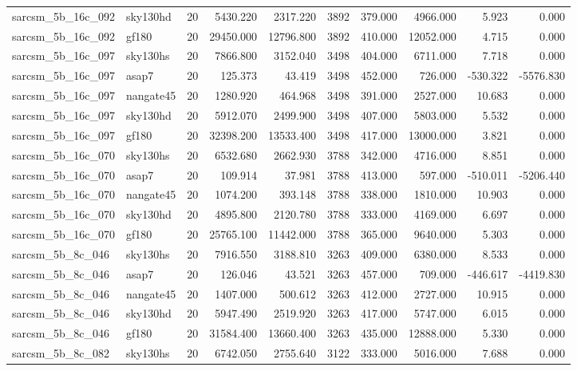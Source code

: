 \documentclass{article}
\begin{document}
\begin{longtable}{llrrrrrrrr}
sarcsm\_5b\_16c\_092 & sky130hd & 20 & 5430.220 & 2317.220 & 3892 & 379.000 & 4966.000 & 5.923 & 0.000 \\
sarcsm\_5b\_16c\_092 & gf180 & 20 & 29450.000 & 12796.800 & 3892 & 410.000 & 12052.000 & 4.715 & 0.000 \\
sarcsm\_5b\_16c\_097 & sky130hs & 20 & 7866.800 & 3152.040 & 3498 & 404.000 & 6711.000 & 7.718 & 0.000 \\
sarcsm\_5b\_16c\_097 & asap7 & 20 & 125.373 & 43.419 & 3498 & 452.000 & 726.000 & -530.322 & -5576.830 \\
sarcsm\_5b\_16c\_097 & nangate45 & 20 & 1280.920 & 464.968 & 3498 & 391.000 & 2527.000 & 10.683 & 0.000 \\
sarcsm\_5b\_16c\_097 & sky130hd & 20 & 5912.070 & 2499.900 & 3498 & 407.000 & 5803.000 & 5.532 & 0.000 \\
sarcsm\_5b\_16c\_097 & gf180 & 20 & 32398.200 & 13533.400 & 3498 & 417.000 & 13000.000 & 3.821 & 0.000 \\
sarcsm\_5b\_16c\_070 & sky130hs & 20 & 6532.680 & 2662.930 & 3788 & 342.000 & 4716.000 & 8.851 & 0.000 \\
sarcsm\_5b\_16c\_070 & asap7 & 20 & 109.914 & 37.981 & 3788 & 413.000 & 597.000 & -510.011 & -5206.440 \\
sarcsm\_5b\_16c\_070 & nangate45 & 20 & 1074.200 & 393.148 & 3788 & 338.000 & 1810.000 & 10.903 & 0.000 \\
sarcsm\_5b\_16c\_070 & sky130hd & 20 & 4895.800 & 2120.780 & 3788 & 333.000 & 4169.000 & 6.697 & 0.000 \\
sarcsm\_5b\_16c\_070 & gf180 & 20 & 25765.100 & 11442.000 & 3788 & 365.000 & 9640.000 & 5.303 & 0.000 \\
sarcsm\_5b\_8c\_046 & sky130hs & 20 & 7916.550 & 3188.810 & 3263 & 409.000 & 6380.000 & 8.533 & 0.000 \\
sarcsm\_5b\_8c\_046 & asap7 & 20 & 126.046 & 43.521 & 3263 & 457.000 & 709.000 & -446.617 & -4419.830 \\
sarcsm\_5b\_8c\_046 & nangate45 & 20 & 1407.000 & 500.612 & 3263 & 412.000 & 2727.000 & 10.915 & 0.000 \\
sarcsm\_5b\_8c\_046 & sky130hd & 20 & 5947.490 & 2519.920 & 3263 & 417.000 & 5747.000 & 6.015 & 0.000 \\
sarcsm\_5b\_8c\_046 & gf180 & 20 & 31584.400 & 13660.400 & 3263 & 435.000 & 12888.000 & 5.330 & 0.000 \\
sarcsm\_5b\_8c\_082 & sky130hs & 20 & 6742.050 & 2755.640 & 3122 & 333.000 & 5016.000 & 7.688 & 0.000 \\

\end{longtable}
\end{document}
